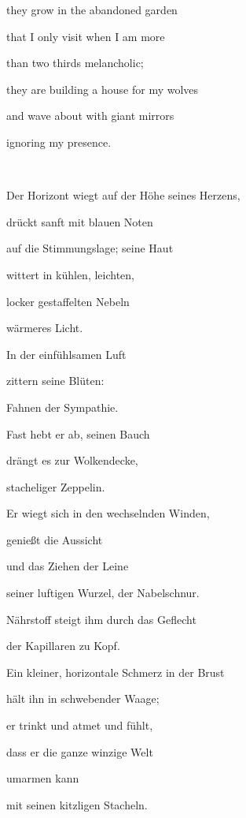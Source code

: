 they grow in the abandoned garden

that I only visit when I am more

than two thirds melancholic;

they are building a house for my wolves 

and wave about with giant mirrors

ignoring my presence.

~



\bigskip


\bigskip

Der Horizont wiegt auf der Höhe seines Herzens,

drückt sanft mit blauen Noten 

auf die Stimmungslage; seine Haut 

wittert in kühlen, leichten,

locker gestaffelten Nebeln

wärmeres Licht. 


\bigskip

In der einfühlsamen Luft \ \ 

zittern seine Blüten: 

Fahnen der Sympathie.

Fast hebt er ab, seinen Bauch

drängt es zur Wolkendecke,

stacheliger Zeppelin.


\bigskip

Er wiegt sich in den wechselnden Winden, 

genießt die Aussicht

und das Ziehen der Leine 

seiner luftigen Wurzel, der Nabelschnur.

Nährstoff steigt ihm durch das Geflecht 

der Kapillaren zu Kopf.


\bigskip

Ein kleiner, horizontale Schmerz in der Brust

hält ihn in schwebender Waage;

er trinkt und atmet und fühlt, 

dass er die ganze winzige Welt 

umarmen kann

mit seinen kitzligen Stacheln.



\bigskip

